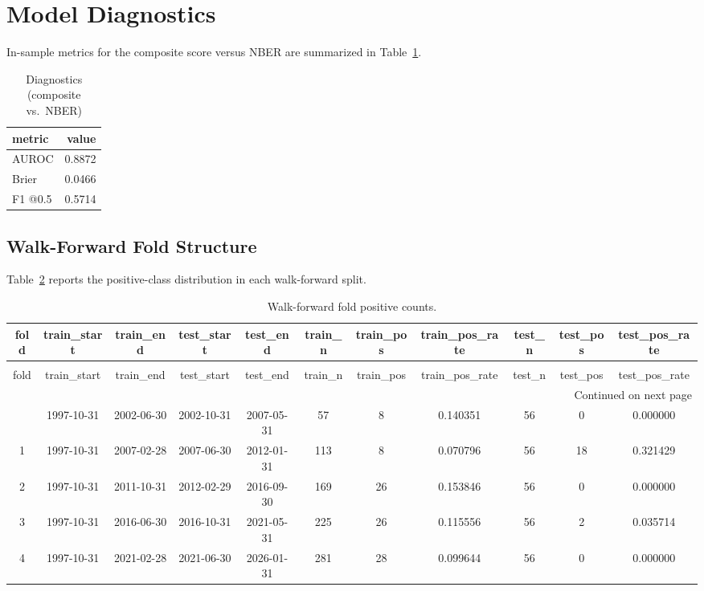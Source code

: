 \documentclass[conference,onecolumn]{IEEEtran}
\begin{document}
\section{Model Diagnostics}
In-sample metrics for the composite score versus NBER are summarized in Table~\ref{tab:diag}.
\begin{table}[htbp]
\caption{Diagnostics (composite vs.\ NBER)}
\begin{center}
\begin{tabular}{|l|r|}
\toprule
metric & value \\
\midrule
AUROC & 0.8872 \\
Brier & 0.0466 \\
F1 @0.5 & 0.5714 \\
\bottomrule
\end{tabular}

\label{tab:diag}
\end{center}
\end{table}
\subsection{Walk-Forward Fold Structure}
Table~\ref{tab:fold_structure} reports the positive-class distribution in each walk-forward split.
\begin{longtable}{|c|c|c|c|c|c|c|c|c|c|c|}
\caption{Walk-forward fold positive counts.} \label{tab:fold_structure} \\
\toprule
fold & train\_start & train\_end & test\_start & test\_end & train\_n & train\_pos & train\_pos\_rate & test\_n & test\_pos & test\_pos\_rate \\
\midrule
\endfirsthead
\caption[]{Walk-forward fold positive counts.} \\
\toprule
fold & train\_start & train\_end & test\_start & test\_end & train\_n & train\_pos & train\_pos\_rate & test\_n & test\_pos & test\_pos\_rate \\
\midrule
\endhead
\midrule
\multicolumn{11}{r}{Continued on next page} \\
\midrule
\endfoot
\bottomrule
\endlastfoot
0 & 1997-10-31 & 2002-06-30 & 2002-10-31 & 2007-05-31 & 57 & 8 & 0.140351 & 56 & 0 & 0.000000 \\
1 & 1997-10-31 & 2007-02-28 & 2007-06-30 & 2012-01-31 & 113 & 8 & 0.070796 & 56 & 18 & 0.321429 \\
2 & 1997-10-31 & 2011-10-31 & 2012-02-29 & 2016-09-30 & 169 & 26 & 0.153846 & 56 & 0 & 0.000000 \\
3 & 1997-10-31 & 2016-06-30 & 2016-10-31 & 2021-05-31 & 225 & 26 & 0.115556 & 56 & 2 & 0.035714 \\
4 & 1997-10-31 & 2021-02-28 & 2021-06-30 & 2026-01-31 & 281 & 28 & 0.099644 & 56 & 0 & 0.000000 \\
\end{longtable}
\end{document}
